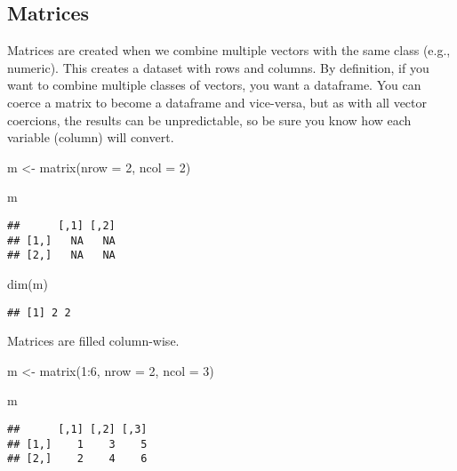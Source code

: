 \documentclass[
]{book}
\newenvironment{Shaded}{\begin{snugshade}}{\end{snugshade}}
\newcommand{\AttributeTok}[1]{\textcolor[rgb]{0.77,0.63,0.00}{#1}}
\newcommand{\DecValTok}[1]{\textcolor[rgb]{0.00,0.00,0.81}{#1}}
\newcommand{\FunctionTok}[1]{\textcolor[rgb]{0.00,0.00,0.00}{#1}}
\newcommand{\NormalTok}[1]{#1}
\newcommand{\OtherTok}[1]{\textcolor[rgb]{0.56,0.35,0.01}{#1}}
\newcommand{\SpecialCharTok}[1]{\textcolor[rgb]{0.00,0.00,0.00}{#1}}
\begin{document}
\hypertarget{matrices}{%
\subsection{Matrices}\label{matrices}}

Matrices are created when we combine multiple vectors with the same class (e.g., numeric). This creates a dataset with rows and columns. By definition, if you want to combine multiple classes of vectors, you want a dataframe. You can coerce a matrix to become a dataframe and vice-versa, but as with all vector coercions, the results can be unpredictable, so be sure you know how each variable (column) will convert.

\begin{Shaded}
\begin{Highlighting}[]
\NormalTok{m }\OtherTok{\textless{}{-}} \FunctionTok{matrix}\NormalTok{(}\AttributeTok{nrow =} \DecValTok{2}\NormalTok{, }\AttributeTok{ncol =} \DecValTok{2}\NormalTok{)}

\NormalTok{m}
\end{Highlighting}
\end{Shaded}

\begin{verbatim}
##      [,1] [,2]
## [1,]   NA   NA
## [2,]   NA   NA
\end{verbatim}

\begin{Shaded}
\begin{Highlighting}[]
\FunctionTok{dim}\NormalTok{(m)}
\end{Highlighting}
\end{Shaded}

\begin{verbatim}
## [1] 2 2
\end{verbatim}

Matrices are filled column-wise.

\begin{Shaded}
\begin{Highlighting}[]
\NormalTok{m }\OtherTok{\textless{}{-}} \FunctionTok{matrix}\NormalTok{(}\DecValTok{1}\SpecialCharTok{:}\DecValTok{6}\NormalTok{, }\AttributeTok{nrow =} \DecValTok{2}\NormalTok{, }\AttributeTok{ncol =} \DecValTok{3}\NormalTok{)}

\NormalTok{m}
\end{Highlighting}
\end{Shaded}

\begin{verbatim}
##      [,1] [,2] [,3]
## [1,]    1    3    5
## [2,]    2    4    6
\end{verbatim}
\end{document}
